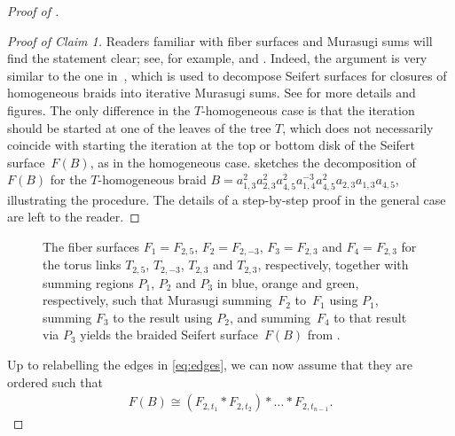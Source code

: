 \documentclass{amsart}
\theoremstyle{definition}
\theoremstyle{remark}
\theoremstyle{plain}
\begin{document}
\begin{proof}[{Proof of }]
\begin{proof}[Proof of Claim 1]
Readers familiar with fiber surfaces and Murasugi sums will find the statement clear; see, for example, \cite[Remark~0.9]{rudolph_new_knot_inv} and \cite{Rudolph_Hopf_plumbing}. Indeed, the argument is very similar to the one in~\cite[Theorem~2]{stallings_1978}, which is used to decompose Seifert surfaces for closures of homogeneous braids into iterative Murasugi sums. See \cite[Step 2 in Section 2 and the proof of Theorem~1.1]{feller_lewark_orbegozo} for more details and figures. The only difference in the $T$-homogeneous case is that the iteration should be started at one of the leaves of the tree $T$, which does not necessarily coincide with starting the iteration at the top or bottom disk of the Seifert surface~$F(B)$, as in the homogeneous case.  sketches the decomposition of~$F(B)$ for the $T$-homogeneous braid $B = a_{1,3}^2 a_{2,3}^2 a_{4,5}^2 a_{1,4}^{-3} a_{4,5}^2 a_{2,3} a_{1,3} a_{4,5}$, illustrating the procedure. The details of a step-by-step proof in the general case are left to the reader.
\end{proof}

\begin{figure}[htbp] 
     \centering
     \def\svgwidth{1\columnwidth}
	  
	\caption{The fiber surfaces $F_1=F_{2,5}$, $F_2=F_{2,-3}$, $F_3=F_{2,3}$ and $F_4=F_{2,3}$ for the torus links $T_{2,5}$, $T_{2,-3}$, $T_{2,3}$ and $T_{2,3}$, respectively, together with summing regions $P_1$, $P_2$ and $P_3$ in blue, orange and green, respectively, such that Murasugi summing~$F_2$ to~$F_1$ using $P_1$, summing $F_3$ to the result using $P_2$, and summing~$F_4$ to that result via $P_3$ yields the braided Seifert surface~$F(B)$ from .}
    \label{fig:seifsurf_T-homo2}
\end{figure}

Up to relabelling the edges in \eqref{eq:edges}, we can now 
assume that they are ordered such that 
\begin{align}\label{eq:Murasugi_sum_torus_links}
F(B) \cong (F_{2,t_1} \ast F_{2,t_2}) \ast \dots \ast F_{2,t_{n-1}}.
\end{align}


\end{proof}
\end{document}
